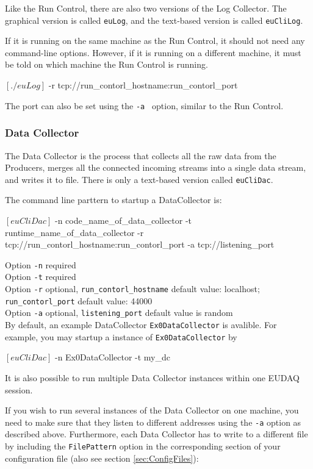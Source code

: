 Like the Run Control, there are also two versions of the Log Collector.
The graphical version is called \texttt{euLog},
and the text-based version is called \texttt{euCliLog}.

If it is running on the same machine as the Run Control, it should not need any command-line options.
However, if it is running on a different machine, it must be told on which machine the Run Control is running.
\begin{listing}[mybash]
$[./euLog]$ -r tcp://{run_contorl_hostname}:{run_contorl_port}
\end{listing}
The port can also be set using the \texttt{-a } option, similar to the Run Control.

\subsubsection{Data Collector}
\label{sec:datacollector}
The Data Collector is the process that collects all the raw data from the Producers,
merges all the connected incoming streams into a single data stream, and writes it to file.
There is only a text-based version called \texttt{euCliDac}.

The command line parttern to startup a DataCollector is:
\begin{listing}[mybash]
$[euCliDac]$ -n {code_name_of_data_collector} -t {runtime_name_of_data_collector} -r tcp://{run_contorl_hostname}:{run_contorl_port} -a tcp://{listening_port}
\end{listing}

Option \texttt{-n} required\\
Option \texttt{-t} required\\
Option \texttt{-r} optional, \texttt{run\_contorl\_hostname} default value: localhost;  \texttt{run\_contorl\_port}  default value: 44000\\
Option \texttt{-a} optional, \texttt{listening\_port} default value is random\\

By default, an example DataCollector \texttt{Ex0DataCollector} is avalible. For example, you may startup a instance of \texttt{Ex0DataCollector} by
\begin{listing}[mybash]
$[euCliDac]$ -n Ex0DataCollector -t my_dc
\end{listing}


It is also possible to run multiple Data Collector instances within
one EUDAQ session. 

If you wish to run several instances of the Data Collector on one
machine, you need to make sure that they listen to different addresses
using the \texttt{-a} option as described above. 
Furthermore, each Data Collector has to write to a different file by including the
\texttt{FilePattern} option in the corresponding section of your
configuration file (also see section \ref{sec:ConfigFiles}):

